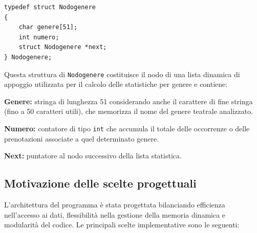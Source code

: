 \documentclass[11pt,a4paper,oneside,openany]{book}
\newenvironment{listacomp}{%
    \small
    \begin{list}{\textendash}{%
        \setlength{\topsep}{2pt}%
        \setlength{\partopsep}{0pt}%
        \setlength{\itemsep}{1pt}%
        \setlength{\parsep}{0pt}%
        \setlength{\leftmargin}{1.2em}%
    }%
}{%
    \end{list}%
}
\begin{document}
\begin{lstlisting}[caption={Definizione della struttura Nodogenere}]
typedef struct Nodogenere
{
    char genere[51];
    int numero;
    struct Nodogenere *next;
} Nodogenere;
\end{lstlisting}
Questa struttura di \texttt{Nodogenere} costituisce il nodo di una lista dinamica di appoggio utilizzata per il calcolo delle statistiche per genere e contiene:
\begin{listacomp}
    \item \textbf{Genere:} stringa di lunghezza 51 considerando anche il carattere di fine stringa (fino a 50 caratteri utili), che memorizza il nome del genere teatrale analizzato.
    \item \textbf{Numero:} contatore di tipo \texttt{int} che accumula il totale delle occorrenze o delle prenotazioni associate a quel determinato genere.
    \item \textbf{Next:} puntatore al nodo successivo della lista statistica.
\end{listacomp}

\subsection{Motivazione delle scelte progettuali}
L'architettura del programma è stata progettata bilanciando efficienza nell'accesso ai dati, flessibilità nella gestione della memoria dinamica e modularità del codice. Le principali scelte implementative sono le seguenti:
\end{document}
